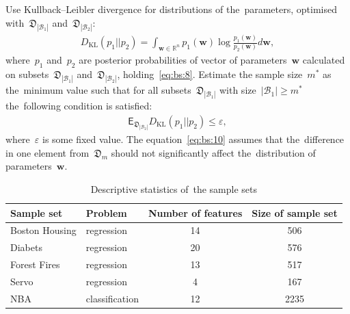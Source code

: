 \documentclass[
11pt,%
tightenlines,%
twoside,%
onecolumn,%
nofloats,%
nobibnotes,%
nofootinbib,%
superscriptaddress,%
noshowpacs,%
centertags]%
{revtex4}
\begin{document}
Use Kullback--Leibler divergence for distributions of
the~parameters, optimised with~$\mathfrak{D}_{|\mathcal{B}_1|}$
and~$\mathfrak{D}_{|\mathcal{B}_2|}$:
\[
\label{eq:bs:9}
\begin{aligned}
    D_\text{KL}\left(p_1 || p_2\right) = \int_{\mathbf{w}\in\mathbb{R}^{n}}p_1(\mathbf{w})\log\frac{p_1(\mathbf{w})}{p_2(\mathbf{w})}d\mathbf{w},
\end{aligned}
\]
where~$p_1$ and~$p_2$ are posterior probabilities of vector of
parameters~$\mathbf{w}$ calculated on
subsets~$\mathfrak{D}_{|\mathcal{B}_1|}$
and~$\mathfrak{D}_{|\mathcal{B}_2|}$, holding~\eqref{eq:bs:8}.
Estimate the sample size~$m^*$ as the~minimum value such that for
all subsets~$\mathfrak{D}_{|\mathcal{B}_1|}$ with
size~$|\mathcal{B}_1|\geq m^*$ the~following condition is satisfied:
\begin{equation}
\label{eq:bs:10}
\begin{aligned}
    \mathsf{E}_{\mathfrak{D}_{|\mathcal{B}_2|}}D_\text{KL}\left(p_1 || p_2\right) \leq \varepsilon,
\end{aligned}
\end{equation}
where~$\varepsilon$ is some fixed value. The
equation~\eqref{eq:bs:10}  assumes that the~difference in one
element from~$\mathfrak{D}_m$ should not significantly affect
the~distribution of parameters~$\mathbf{w}$.

\begin{table}[!htp]
\centering
\caption{ Descriptive statistics of~the sample sets}
\label{table20}
\begin{tabular}{l|l|c|c}
\hline
    \centering Sample set & Problem & Number of features & Size of sample set\\
    \hline  Boston Housing  &regression     &14 & 506\\
    \hline  Diabets                 & regression        &20 & 576\\
    \hline  Forest Fires            & regression        & 13 & 517\\
    \hline  Servo                   & regression    & 4 & 167\\
    \hline  NBA                     & classification    & 12 & 2235\\
\hline
\end{tabular}
\end{table}
\end{document}
